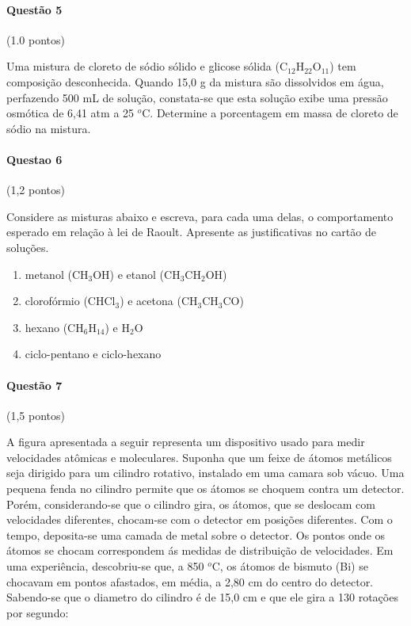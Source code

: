 \documentclass[12pt,a4paper]{article}
\begin{document}
\paragraph{Questão 5} (1.0 pontos)

Uma mistura de cloreto de sódio sólido e glicose sólida (C$_{12}$H$_{22}$O$_{11}$) tem composição desconhecida. Quando 15,0 g da mistura são dissolvidos em água, perfazendo 500 mL de solução, constata-se que esta solução exibe uma pressão osmótica de 6,41 atm a 25 $^o$C. Determine a porcentagem em massa de cloreto de sódio na mistura.

\paragraph{Questao 6} (1,2 pontos)

Considere as misturas abaixo e escreva, para cada uma delas, o comportamento esperado em relação à lei de Raoult. Apresente as justificativas no cartão de soluções.

\begin{enumerate}[label=\roman*.]

\item metanol (CH$_3$OH) e etanol (CH$_3$CH$_2$OH)

\item clorofórmio (CHCl$_3$) e acetona (CH$_3$CH$_3$CO)

\item hexano (CH$_6$H$_{14}$) e H$_2$O

\item ciclo-pentano e ciclo-hexano

\end{enumerate}

\paragraph{Questão 7} (1,5 pontos)

A figura apresentada a seguir representa um dispositivo usado para medir velocidades atômicas e moleculares. Suponha que um feixe de átomos metálicos seja dirigido para um cilindro rotativo, instalado em uma camara sob vácuo. Uma pequena fenda no cilindro permite que os átomos se choquem contra um detector. Porém, considerando-se que o cilindro gira, os átomos, que se deslocam com velocidades diferentes, chocam-se com o detector em posições diferentes. Com o tempo, deposita-se uma camada de metal sobre o detector. Os pontos onde os átomos se chocam correspondem ás medidas de distribuição de velocidades. Em uma experiência, descobriu-se que, a 850 $^o$C, os átomos de bismuto (Bi) se chocavam em pontos afastados, em média, a 2,80 cm do centro do detector. Sabendo-se que o diametro do cilindro é de 15,0 cm e que ele gira a 130 rotações por segundo:
\end{document}
